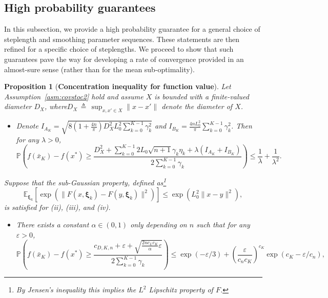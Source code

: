 \documentclass[11pt,reqno]{amsart}
\newcommand{\1}{{\bf 1}}
\newcommand{\2}{{\bf 2}}
\newcommand{\bxi}{\boldsymbol{\xi}}
\newcommand{\E}{\mathbb E}
\newcommand{\al}{\alpha}
\numberwithin{equation}{section}
\newtheorem{proposition}{Proposition}[section]
\theoremstyle{remark}
\begin{document}
{		\subsection{{High probability guarantees}}
		{In this subsection, we provide a high probability guarantee for a general choice of steplength and smoothing parameter sequences. These statements are then refined for a specific choice of steplengths. We proceed to show that such guarantees pave the way for developing a rate of convergence provided in an almost-sure sense (rather than for the mean sub-optimality).}   
		\begin{proposition}[\bf{Concentration inequality for function value}]\label{prop:concentration}
			{Let Assumption~\ref{asm:covstoc2} hold and assume $X$ is bounded with a finite-valued diameter $D_X$, where$D_X \, \triangleq \, \sup_{x, x' \in X} \| x - x'\|$ denote the diameter of  $X$.}
			\begin{itemize}
				\item[(i)] Denote $I_{A_K}=\sqrt{8\left(1+\frac{4n}{\pi}\right)D_X^2L_0^2\sum_{k=0}^{K-1}\gamma_k^2}$ and $I_{B_K}=\frac{4nL_0^2}{\pi} \sum_{k=0}^{K-1}\gamma_k^2$. Then {for any $\lambda > 0$,}
				\begin{equation*}
					\mathbb{P}\left(f(\bar{x}_K)-f(x^*)\geq \frac{D_X^2+\sum_{k=0}^{K-1}2L_0\sqrt{n+1}\gamma_k\eta_k 
						+\lambda\left(I_{A_K}+I_{B_K}\right)}{2\sum_{k=0}^{K-1} \gamma_k}\right)\leq \frac{1}{\lambda}+\frac{1}{\lambda^2}.
				\end{equation*}
			\end{itemize}
			{Suppose that the sub-Gaussian property, defined as\footnote{By Jensen's inequality this implies the $L^2$ Lipschitz property of $F$.}
				\begin{equation}\label{eq:sub-Gaussian}
					\E_{\bxi_k}\left[\exp\left(\|F(x,\bxi_k)-F(y,\bxi_k)\|^2\right)\right]\leq \exp\left(L_0^2\|x-y\|^2\right),
				\end{equation}
				is satisfied for (ii), (iii), and (iv)}.
			\begin{itemize}
				\item[(ii)]  There exists a constant $\al \in (0,1)$ only depending on $n$ such that for any $\varepsilon> 0$, 
				\begin{equation*}
					\mathbb{P}\left(f(\bar{x}_K)-f(x^*)\geq \frac{c_{D,K,n}+\varepsilon+\sqrt{\frac{2nc_Lc_K}{\al}\varepsilon}}{2\sum_{k=0}^{K-1} \gamma_k}\right)\leq \exp\left(-\varepsilon/3\right)+\left(\frac{\varepsilon}{c_nc_K}\right)^{c_K}\exp\left(c_K-\varepsilon/c_n\right),
				\end{equation*}

\end{itemize}
\end{proposition}}
\end{document}
